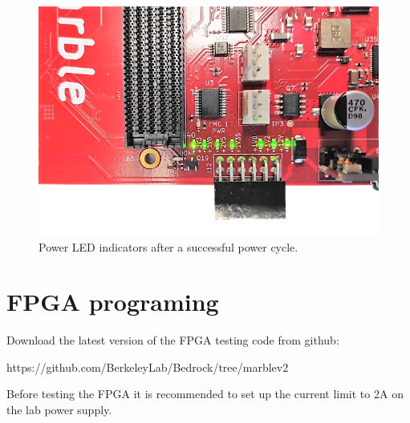 \documentclass[12pt,oneside,a4]{article}
\begin{document}
\begin{figure}[H]
\begin{center}
\includegraphics[width=0.7\linewidth]{leds.png}
 \caption{Power LED indicators after a successful power cycle.}\label{leds}
\end{center}
\end{figure}

\section{FPGA programing}
Download the latest version of the FPGA testing code from github:
\begin{leftbar}
https://github.com/BerkeleyLab/Bedrock/tree/marblev2
\end{leftbar}

\begin{leftbar}
Before testing the FPGA it is recommended to set up the current limit to 2A on the lab power supply.
\end{leftbar}
\end{document}
